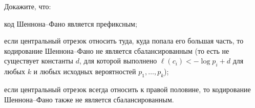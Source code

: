 Докажите, что:
\begin{enumcyr}
    \item код Шеннона--Фано является префиксным;
    \item если центральный отрезок относить туда, куда попала его большая часть, то кодирование
        Шеннона--Фано не является сбалансированным (то есть не существует константы $d$, для которой
        выполнено $\ell(c_i) < -\log{p_i} + d$ для любых $k$ и любых исходных вероятностей $p_1, \dots,
        p_k$);
    \item если центральный отрезок всегда относить к правой половине, то кодирование Шеннона--Фано также
        не является сбалансированным.
\end{enumcyr}
